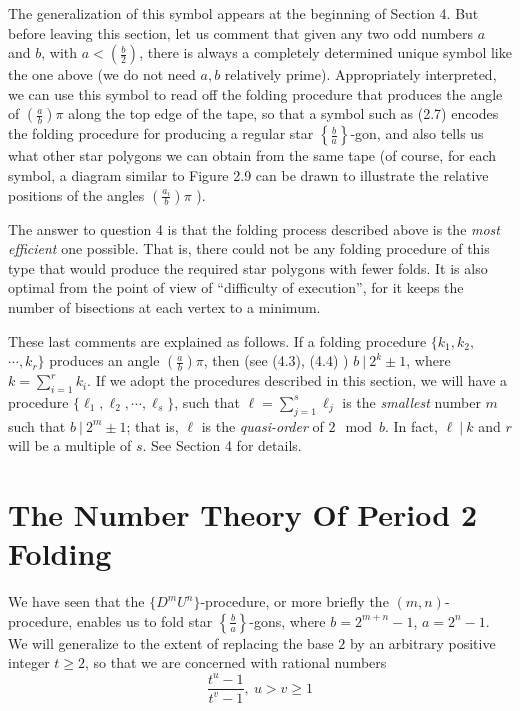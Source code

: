 The generalization of this symbol appears at the beginning of Section 4. But before leaving this section, let us comment that given any two odd numbers $a$ and $b$, with $a < \left( \frac{b}{2} \right)$, there is always a completely determined unique symbol like the one above (we do not need $a,b$ relatively prime). Appropriately interpreted, we can use this symbol to read off the folding procedure that produces the angle of $\left( \frac{a}{b} \right) \pi$ along the top edge of the tape, so that a symbol such as (2.7) encodes the folding procedure for producing a regular star $\left\{ \frac{b}{a} \right\}$-gon, and also tells us what other star polygons we can obtain from the same tape (of course, for each symbol, a diagram similar to Figure 2.9 can be drawn to illustrate the relative positions of the angles $\left( \frac{a_{i}}{b} \right) \pi$ ).

The answer to question 4 is that the folding process described above is the \emph{most efficient} one possible. That is, there could not be any folding procedure of this type that would produce the required star polygons with fewer folds. It is also optimal from the point of view of ``difficulty of execution'', for it keeps the number of bisections at each vertex to a minimum. 

These last comments are explained as follows. If a folding procedure $\{ k_{1}, k_{2},$ $\cdots, k_{r} \}$ produces an angle $\left( \frac{a}{b} \right) \pi$, then (see (4.3), (4.4) ) $b\ |\ 2^k \pm 1$, where $\displaystyle k = \sum^{r}_{i=1} k_{i}$. If we adopt the procedures described in this section, we will have a procedure $\{ \ell_{1}, \ell_{2}, \cdots, \ell_{s} \}$, such that $\displaystyle \ell = \sum^{s}_{j=1} \ell_{j}$ is the \emph{smallest} number $m$ such that $b\ |\ 2^{m} \pm 1$; that is, $\ell$ is the \emph{quasi-order} of $2 \mod{b}$. In fact, $\ell\ |\ k$ and $r$ will be a multiple of $s$. See Section 4 for details.




\newpage

\section{The Number Theory Of Period 2 Folding}


We have seen that the $\{ D^{m} U^{n} \}$-procedure, or more briefly the $(m,n)$-procedure, enables us to fold star $\left\{ \frac{b}{a} \right\}$-gons, where $b = 2^{m+n}-1$, $a = 2^{n}-1$. We will generalize to the extent of replacing the base $2$ by an arbitrary positive integer $t \geq 2$, so that we are concerned with rational numbers
\begin{equation}
\frac{t^{u}-1}{t^{v}-1},\ u > v \geq 1  \tag{3.1}
\end{equation}

